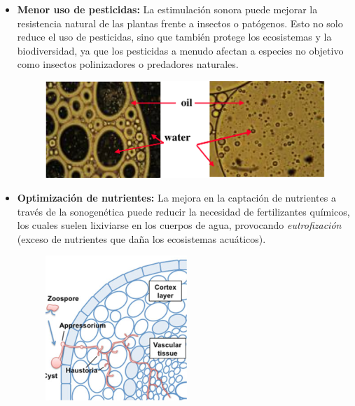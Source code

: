 \documentclass[twocolumn]{article}
\begin{document}
\begin{itemize}
    \item \textbf{Menor uso de pesticidas:} La estimulación sonora puede mejorar la resistencia natural de las plantas frente a insectos o patógenos. Esto no solo reduce el uso de pesticidas, sino que también protege los ecosistemas y la biodiversidad, ya que los pesticidas a menudo afectan a especies no objetivo como insectos polinizadores o predadores naturales.
    \begin{figure}[!h]
        \centering
        \includegraphics[width=\linewidth]{imagenes/Captura desde 2024-09-25 22-48-30.png}       
    \end{figure}
    \item \textbf{Optimización de nutrientes:} La mejora en la captación de nutrientes a través de la sonogenética puede reducir la necesidad de fertilizantes químicos, los cuales suelen lixiviarse en los cuerpos de agua, provocando \textit{eutrofización} (exceso de nutrientes que daña los ecosistemas acuáticos).
    \begin{figure}[!h]
        \centering
        \includegraphics[width=\linewidth]{imagenes/Captura desde 2024-09-25 22-31-44.png}       
    \end{figure}
\end{itemize}
\end{document}
